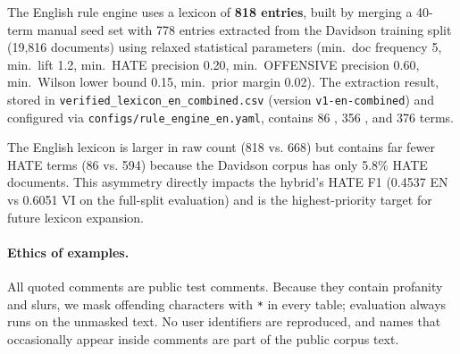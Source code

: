 The English rule engine uses a lexicon of \textbf{818 entries}, built by merging
a 40-term manual seed set with 778 entries extracted from the Davidson training
split (19{,}816 documents) using relaxed statistical parameters (min.\ doc
frequency 5, min.\ lift 1.2, min.\ HATE precision 0.20, min.\ OFFENSIVE precision
0.60, min.\ Wilson lower bound 0.15, min.\ prior margin 0.02).  The extraction
result, stored in \texttt{verified\_lexicon\_en\_combined.csv} (version
\texttt{v1-en-combined}) and configured via \texttt{configs/rule\_engine\_en.yaml},
contains 86 \hate{}, 356 \off{}, and 376 \clean{} terms.

The English lexicon is larger in raw count (818 vs. 668) but contains far fewer
HATE terms (86 vs. 594) because the Davidson corpus has only 5.8\% HATE
documents.  This asymmetry directly impacts the hybrid's HATE F1 (0.4537 EN vs
0.6051 VI on the full-split evaluation) and is the highest-priority target for future
lexicon expansion.

\paragraph{Ethics of examples.}
All quoted comments are public test comments.  Because they contain profanity
and slurs, we mask offending characters with \texttt{*} in every table;
evaluation always runs on the unmasked text.  No user identifiers are
reproduced, and names that occasionally appear inside comments are part of the
public corpus text.